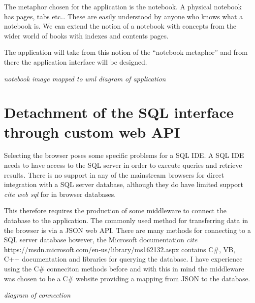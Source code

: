 The metaphor chosen for the application is the notebook. A physical
notebook has pages, tabs etc\ldots{} These are easily understood by
anyone who knows what a notebook is. We can extend the notion of a
notebook with concepts from the wider world of books with indexes and
contents pages.

The application will take from this notion of the ``notebook metaphor''
and from there the application interface will be designed.

\emph{notebook image mapped to uml diagram of application}

\section{Detachment of the SQL interface through custom web
API}\label{detachment-of-the-sql-interface-through-custom-web-api}

Selecting the browser poses some specific problems for a SQL IDE. A SQL
IDE needs to have access to the SQL server in order to execute queries
and retrieve results. There is no support in any of the mainstream
browsers for direct integration with a SQL server database, although
they do have limited support \emph{cite web sql} for in browser
databases.

This therefore requires the production of some middleware to connect the
database to the application. The commonly used method for transferring
data in the browser is via a JSON web API. There are many methods for
connecting to a SQL server database however, the Microsoft documentation
\emph{cite} https://msdn.microsoft.com/en-us/library/ms162132.aspx
contains C\#, VB, C++ documentation and libraries for querying the
database. I have experience using the C\# conneciton methods before and
with this in mind the middleware was chosen to be a C\# website
providing a mapping from JSON to the database.

\emph{diagram of connection}
